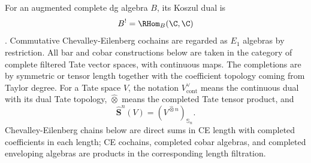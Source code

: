 \documentclass[11pt]{memoir}
\begin{document}
\begin{defn}
  For an augmented complete dg algebra $B$, its Koszul dual is
  $$B^!=\RHom_B(\C,\C)$$
  \cite{priddy}.
  Commutative Chevalley-Eilenberg cochains are regarded as $E_1$ algebras by
  restriction. All bar and cobar constructions below are taken in the category
  of complete filtered Tate vector spaces, with continuous maps. The
  completions are by symmetric or tensor length together with the coefficient
  topology coming from Taylor degree.
  For a Tate space $V$, the notation $V^\vee_{\mathrm{cont}}$ means the
  continuous dual with its dual Tate topology, $\widehat\otimes$ means the
  completed Tate tensor product, and
  $$\widehat{\mathbf S}^n(V)=(V^{\widehat\otimes n})_{\mathbb S_n}.$$
  Chevalley-Eilenberg chains below are direct sums in CE length with completed
  coefficients in each length; CE cochains, completed cobar algebras, and
  completed enveloping algebras are products in the corresponding length
  filtration.
\end{defn}
\end{document}
